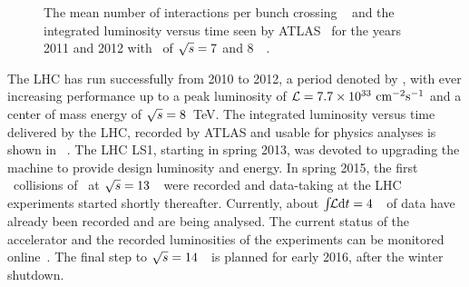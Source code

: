\begin{figure}[tbp!]
\centering
{}
\caption[\gls{ATLAS} integrated luminosity and pile-up conditions]{
%
The mean number of interactions per bunch crossing \meanmu~ and the integrated luminosity versus time seen by \gls{ATLAS}~ for the years 2011 and 2012 with \cmes\ of ${\sqrt{s}}=7$ and $8$~\TeV~\cite{Aad:2013ucp,ATLASLumiPlots}.
%
\label{fig:cumulumi}}
\end{figure}
%
The \gls{LHC} has run successfully from 2010 to 2012, a period denoted by \RunOne, with ever increasing performance up to a peak luminosity of $\mathcal L=7.7\times 10^{33}~\mathrm{cm}^{-2} \mathrm{s}^{-1}$ and a center of mass energy of ${\sqrt{s}}=8$~TeV. The integrated luminosity versus time delivered by the \gls{LHC}, recorded by \gls{ATLAS} and usable for physics analyses is shown in \fig~. The \gls{LHC} \gls{LS1}, starting in spring 2013, was devoted to upgrading the machine to provide design luminosity and energy. In spring 2015, the first \pp\ collisions of \RunTwo\ at ${\sqrt{s}}=13$~\TeV\ were recorded and data-taking at the \gls{LHC} experiments started shortly thereafter. Currently, about $\int\!\!{\mathcal L}\mathrm{d}t=4$~\invfb\ of data have already been recorded and are being analysed.
%
The current status of the accelerator and the recorded luminosities of the experiments can be monitored online~\cite{LHCcurr}.
%
The final step to ${\sqrt{s}}=14$~\TeV\ is planned for early 2016, after the winter shutdown. 




